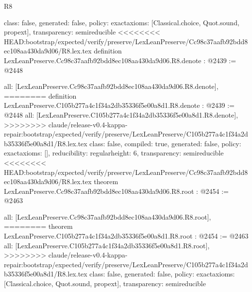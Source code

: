 \begin{lexlean}{R8}
\begin{coremodule}
{{{{{{{{{{{{{{{{  class: false,
  generated: false,
  policy: exact{axioms: [Classical.choice, Quot.sound, propext]},
  transparency: semireducible
}
<<<<<<<< HEAD:bootstrap/expected/verify/preserve/LexLeanPreserve/Cc98c37aafb92bdd8ec108aa430da9d06/R8.lex.tex
definition LexLeanPreserve.Cc98c37aafb92bdd8ec108aa430da9d06.R8.denote : @2439 := @2448 {
  all: [LexLeanPreserve.Cc98c37aafb92bdd8ec108aa430da9d06.R8.denote],
========
definition LexLeanPreserve.C105b277a4c1f34a2db35336f5e00a8d1.R8.denote : @2439 := @2448 {
  all: [LexLeanPreserve.C105b277a4c1f34a2db35336f5e00a8d1.R8.denote],
>>>>>>>> claude/release-v0.4-kappa-repair:bootstrap/expected/verify/preserve/LexLeanPreserve/C105b277a4c1f34a2db35336f5e00a8d1/R8.lex.tex
  class: false,
  compiled: true,
  generated: false,
  policy: exact{axioms: []},
  reducibility: regular{height: 6},
  transparency: semireducible
}
<<<<<<<< HEAD:bootstrap/expected/verify/preserve/LexLeanPreserve/Cc98c37aafb92bdd8ec108aa430da9d06/R8.lex.tex
theorem LexLeanPreserve.Cc98c37aafb92bdd8ec108aa430da9d06.R8.root : @2454 := @2463 {
  all: [LexLeanPreserve.Cc98c37aafb92bdd8ec108aa430da9d06.R8.root],
========
theorem LexLeanPreserve.C105b277a4c1f34a2db35336f5e00a8d1.R8.root : @2454 := @2463 {
  all: [LexLeanPreserve.C105b277a4c1f34a2db35336f5e00a8d1.R8.root],
>>>>>>>> claude/release-v0.4-kappa-repair:bootstrap/expected/verify/preserve/LexLeanPreserve/C105b277a4c1f34a2db35336f5e00a8d1/R8.lex.tex
  class: false,
  generated: false,
  policy: exact{axioms: [Classical.choice, Quot.sound, propext]},
  transparency: semireducible
}

}}}}}}}}}}}}}}}}}
\end{coremodule}
\end{lexlean}
